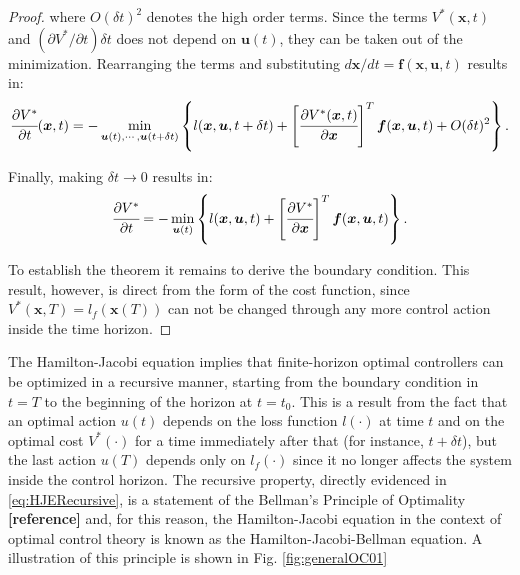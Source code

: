 \documentclass[a4paper,11pt]{book}
\numberwithin{figure}{chapter}
\numberwithin{equation}{chapter}
\numberwithin{table}{chapter}
\theoremstyle{definition}
\begin{document}
\begin{proof}
    \noindent where $O(\delta t)^2$ denotes the high order terms. Since the terms $V^*(\bm{x}, t)$ and $(\partial V^*/\partial t) \delta t$ does not depend on $\bm{u}(t)$, they can be taken out of the minimization. Rearranging the terms and substituting $d \bm{x} / dt = \bm{f}(\bm{x}, \bm{u}, t)$ results in:
    \begin{equation}
        \cfrac{\partial V^*}{\partial t}(\bm{x}, t) =  - \min_{\bm{u}(t), \cdots, \bm{u}(t+\delta t)} \left\{ l(\bm{x}, \bm{u}, t + \delta t)  + \left[ \cfrac{\partial V^*(\bm{x}, t)}{\partial \bm{x}} \right]^T \bm{f}(\bm{x}, \bm{u}, t) + O(\delta t)^2  \right\}
    .\end{equation}
    
    Finally, making $\delta t \to 0$ results in:
    \begin{equation}
        \cfrac{\partial V^*}{\partial t} =  - \min_{\bm{u}(t)} \left\{ l(\bm{x}, \bm{u}, t)  + \left[ \cfrac{\partial V^*}{\partial \bm{x}} \right]^T \bm{f}(\bm{x}, \bm{u}, t) \right\}
    .\end{equation}
    
    To establish the theorem it remains to derive the boundary condition. This result, however, is direct from the form of the cost function, since $V^*(\bm{x}, T) = l_f(\bm{x}(T))$ can not be changed through any more control action inside the time horizon.
\end{proof}

The Hamilton-Jacobi equation implies that finite-horizon optimal controllers can be optimized in a recursive manner, starting from the boundary condition in $t = T$ to the beginning of the horizon at $t = t_0$. This is a result from the fact that an optimal action $u(t)$ depends on the loss function $l(\cdot)$ at time $t$ and on the optimal cost $V^*(\cdot)$ for a time immediately after that (for instance, $t+\delta t$), but the last action $u(T)$ depends only on $l_f(\cdot)$ since it no longer affects the system inside the control horizon. The recursive property, directly evidenced in \eqref{eq:HJERecursive}, is a statement of the Bellman's Principle of Optimality \textbf{[reference]} and, for this reason, the Hamilton-Jacobi equation in the context of optimal control theory is known as the Hamilton-Jacobi-Bellman equation. A illustration of this principle is shown in Fig. \ref{fig:generalOC01}
\end{document}
